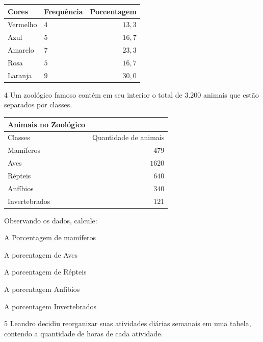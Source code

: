 
\begin{table}[h]\centering
\begin{tabular}{llr}
\toprule
Cores & Frequência & Porcentagem\\
\midrule
Vermelho & $4$ & $13,3$\\
Azul & $5$ & $16,7$\\
Amarelo & $7$ & $23,3$\\
Rosa & $5$ & $16,7$\\
Laranja & $9$ & $30,0$\\
\bottomrule
\end{tabular}
\end{table}

\reduline{\hfill}

\num{4}  Um zoológico famoso contém em seu interior o total de $3.200$ animais
que estão separados por classes.

\begin{table}[h]\centering
\begin{tabular}[]{lr}
\toprule
Animais no Zoológico &\\
\midrule
Classes & Quantidade de animais\\
Mamíferos & $479$\\
Aves & $1620$\\
Répteis & $640$\\
Anfíbios & $340$\\
Invertebrados & $121$\\
\bottomrule
\end{tabular}
\end{table}

Observando os dados, calcule:

\begin{escolha}
\item A Porcentagem de mamíferos 
\item A porcentagem de Aves 
\item A porcentagem de Répteis 
\item A porcentagem Anfíbios 
\item A porcentagem Invertebrados 
\end{escolha}

\num{5}  Leandro decidiu reorganizar suas atividades diárias semanais em uma
tabela, contendo a quantidade de horas de cada atividade.

